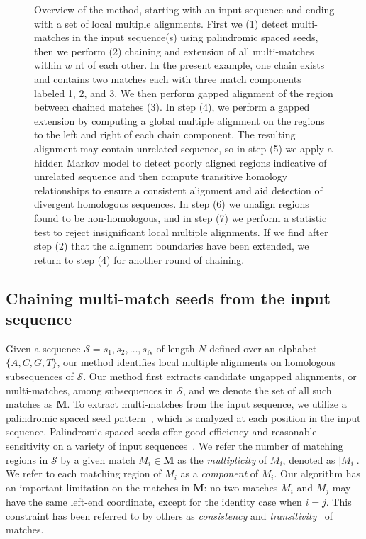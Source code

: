 \documentclass[9.5pt,journal,final,finalsubmission,twocolumn]{IEEEtran}
\begin{document}
\begin{figure}[t!]
\begin{center}
\end{center}
\caption[Overview of our method for local multiple alignment]%
{\scriptsize Overview of the method, starting with an input sequence and ending
with a set of local multiple alignments. First we (1) detect
multi-matches in the input sequence(s) using palindromic spaced seeds,
then we perform (2) chaining and extension of all multi-matches within
$w$ nt of each other.  In the present example, one chain exists and
contains two matches each with three match components labeled 1, 2,
and 3.  We then perform gapped alignment of the region between chained
matches (3).  In step (4), we perform a gapped extension by computing
a global multiple alignment on the regions to the left and right of
each chain component.  The resulting alignment may contain unrelated
sequence, so in step (5) we apply a hidden Markov model to detect
poorly aligned regions indicative of unrelated sequence and then
compute transitive homology relationships to ensure a consistent
alignment and aid detection of divergent homologous sequences.
In step (6) we unalign regions found to be non-homologous, and
in step (7) we perform a statistic test to reject insignificant
local multiple alignments. If we find after step (2) that the alignment boundaries have been
extended, we return to step (4) for another round of chaining.}
\label{fig-main}
\end{figure}

\subsection{Chaining multi-match seeds from the input sequence}
Given a sequence $\mathcal{S}=s_1, s_2,\dots, s_N$ of length $N$
defined over an alphabet $\{A,C,G,T\}$, our method identifies
local multiple alignments on homologous subsequences of
$\mathcal{S}$. Our method first extracts candidate ungapped
alignments, or multi-matches, among subsequences in $\mathcal{S}$,
and we denote the set of all such matches as $\mathbf{M}$. To extract multi-matches from the input
sequence, we utilize a palindromic spaced seed pattern~\cite{ref-zhang}, which is
analyzed at each position in the input sequence.
Palindromic spaced seeds offer good efficiency and
reasonable sensitivity on a variety of input
sequences~\cite{ref-procrast}.  We refer the number of matching regions
in $\mathcal{S}$ by a given match $M_i \in \mathbf{M}$ as the
\textit{multiplicity} of $M_i$, denoted as $|M_i|$. We refer to each
matching region of $M_i$ as a \textit{component} of $M_i$. Our
algorithm has an important limitation on the matches in $\mathbf{M}$:
no two matches $M_i$ and $M_j$ may have the same left-end coordinate,
except for the identity case when $i=j$.  This constraint has been
referred to by others as \textit{consistency} and
\textit{transitivity}~\cite{ref-transitivity} of matches.
\end{document}
